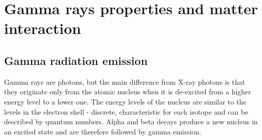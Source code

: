 
\chapter{Gamma rays properties and matter interaction}
\label{gammas}

\section{Gamma radiation emission}


Gamma rays are photons, but the main difference from X-ray photons is that they originate only from the atomic nucleus when it is de-excited from a higher energy level to a lower one. The energy levels of the nucleus are similar to the levels in the electron shell - discrete, characteristic for each isotope and can be described by quantum numbers. Alpha and beta decays produce a new nucleus in an excited state and are therefore followed by gamma emission.




